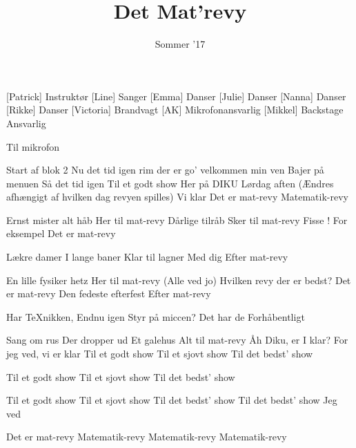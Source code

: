 \documentclass[a4paper,11pt]{article}
\title{Det Mat'revy}
\author{Sommer '17}
\begin{document}
\maketitle

\begin{roles}
[Patrick] Instruktør
[Line] Sanger
[Emma] Danser
[Julie] Danser
[Nanna] Danser
[Rikke] Danser
[Victoria] Brandvagt
[AK] Mikrofonansvarlig
[Mikkel] Backstage Ansvarlig
\end{roles}

\begin{props}
     Til mikrofon
\end{props}

\begin{song}
 Start af blok 2
Nu det tid igen
rim der er go'
velkommen min ven
Bajer på menuen
Så det tid igen
Til et godt show
Her på DIKU
Lørdag aften (Ændres afhængigt af hvilken dag revyen spilles)
Vi klar
Det er mat-revy
Matematik-revy

 Ernst mister alt håb
Her til mat-revy
Dårlige tilråb
Sker til mat-revy
Fisse ! For eksempel
Det er mat-revy

 Lækre damer
I lange baner
Klar til lagner
Med dig
Efter mat-revy

 En lille fysiker hetz
Her til mat-revy (Alle ved jo)
Hvilken revy der er bedst?
Det er mat-revy
Den fedeste efterfest
Efter mat-revy

 Har TeXnikken,
Endnu igen
Styr på miccen?
Det har de
Forhåbentligt

 Sang om rus
Der dropper ud
Et galehus
Alt til mat-revy
Åh Diku, er I klar?
For jeg ved, vi er klar
Til et godt show
Til et sjovt show
Til det bedst' show

 Til et godt show
Til et sjovt show
Til det bedst' show

 Til et godt show
Til et sjovt show
Til det bedst' show
Til det bedst' show
Jeg ved

 Det er mat-revy
Matematik-revy
Matematik-revy
Matematik-revy
\end{song}
\end{document}
